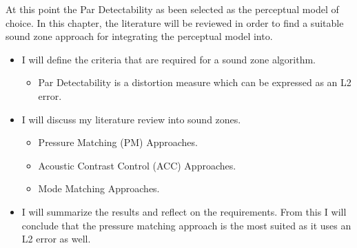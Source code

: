 At this point the Par Detectability as been selected as the perceptual model of choice.
In this chapter, the literature will be reviewed in order to find a suitable sound zone approach for integrating 
the perceptual model into.
\begin{itemize}
    \item I will define the criteria that are required for a sound zone algorithm.
        \begin{itemize}
            \item Par Detectability is a distortion measure which can be expressed as an L2 error.
        \end{itemize}
    \item I will discuss my literature review into sound zones.
        \begin{itemize}
            \item Pressure Matching (PM) Approaches.
            \item Acoustic Contrast Control (ACC) Approaches.
            \item Mode Matching Approaches.
        \end{itemize}
    \item I will summarize the results and reflect on the requirements.
        From this I will conclude that the pressure matching approach is the most suited as it uses an L2 error as well.
\end{itemize}
